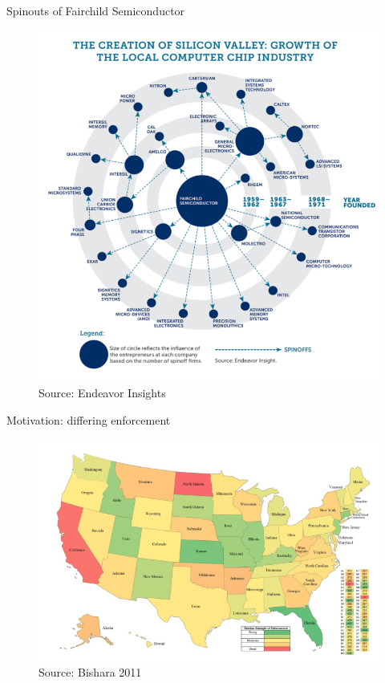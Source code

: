 \documentclass[english,usenames,dvipsnames]{beamer}
\begin{document}
\begin{frame}{Spinouts of Fairchild Semiconductor}
\label{fairchild_spinouts}
\hyperlink{Introduction}{}
\begin{figure}
	\includegraphics[scale=0.38]{figures/fairchild_spinouts}
	\caption{Source: Endeavor Insights}
\end{figure}
\end{frame}

\begin{frame}{Motivation: differing enforcement}
\label{differing_enforcement}
\hyperlink{Motivation2}{}
\begin{figure}
	\includegraphics[scale=0.7]{figures/map_bishara_2009}
	\caption{Source: Bishara 2011}
\end{figure}
\end{frame}
\end{document}
